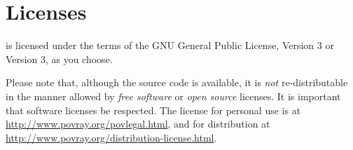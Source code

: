 \chapter{Licenses}%
\label{chap:licenses}

	\IXpkgu{} is licensed under the terms of the GNU
	General Public License, Version 3 or Version 3, as you choose.
	
	Please note that, although the source code is available,
	it is \emph{not} re-distributable in the manner allowed
	by \emph{free software} or \emph{open source} licenses.
	It is important that software licenses be respected.
	The \IXpov{} license for personal use is at
	\url{http://www.povray.org/povlegal.html}, and for distribution
	at \url{http://www.povray.org/distribution-license.html}.

